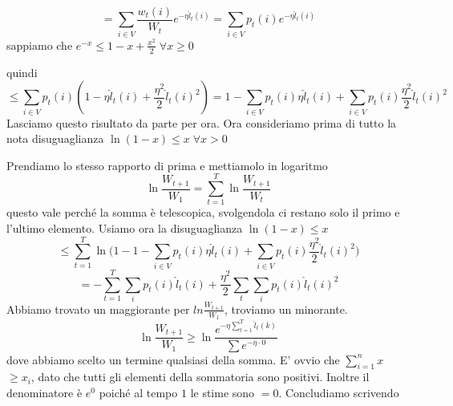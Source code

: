 \documentclass[12pt]{report}
\begin{document}
$$= \sum_{i \in V} \frac{w_t(i)}{W_t}e^{-\eta \hat l_t(i)} = \sum_{i \in V}p_t(i) e^{-\eta \hat l_t(i)} $$
sappiamo che $e^{-x} \leq 1 - x + \frac{x^2}{2} \; \forall x \geq 0$

\begin{center}
\end{center}

\noindent
quindi 
$$ \leq \sum_{i \in V} p_t(i) (1 - \eta \hat l_t(i) + \frac{\eta^2}{2} \hat l_t(i)^2) = 1 - \sum_{i \in V} p_t(i) \eta \hat l_t(i) + \sum_{i \in V} p_t(i) \frac{\eta^2}{2} \hat l_t(i)^2 $$
Lasciamo questo risultato da parte per ora. Ora consideriamo prima di tutto la nota disuguaglianza $\ln(1-x) \leq x \; \forall x > 0$

\begin{center}
\end{center}

\noindent
Prendiamo lo stesso rapporto di prima e mettiamolo in logaritmo
$$\ln{\frac{W_{t+1}}{W_1}} = \sum_{t=1}^T  \ln{\frac{W_{t+1}}{W_t}}$$
questo vale perché la somma è telescopica, svolgendola ci restano solo il primo e l'ultimo elemento. Usiamo ora la disuguaglianza $\ln{(1-x)} \leq x$
$$\leq \sum_{t = 1}^T \ln{(1 - 1 - \sum_{i \in V} p_t(i) \eta \hat l_t(i) + \sum_{i \in V} p_t(i) \frac{\eta^2}{2} \hat l_t(i)^2})$$
$$= - \sum_{t = 1}^T \sum_i p_t(i) \hat l_t(i) + \frac{\eta^2}{2} \sum_t \sum_i p_t(i) \hat l_t(i)^2$$
Abbiamo trovato un maggiorante per $ln{\frac{W_{t+1}}{W_1}}$, troviamo un minorante.
$$\ln{\frac{W_{t+1}}{W_1}} \geq \ln{\frac{e^{-\eta \sum_{t = 1}^T \hat l_t(k)}}{\sum e^{-\eta \cdot 0}}}$$
dove abbiamo scelto un termine qualsiasi della somma. E' ovvio che $\sum_{i = 1}^n x$ $\geq x_i$, dato che tutti gli elementi della sommatoria sono positivi. Inoltre il denominatore è $e^0$ poiché al tempo $1$ le stime sono $= 0$. Concludiamo scrivendo
\end{document}
